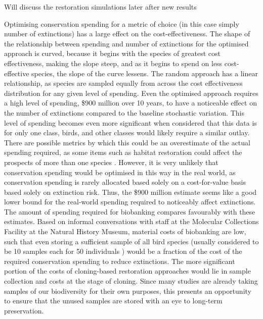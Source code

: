 \documentclass[10pt]{article}
\begin{document}
	Will discuss the restoration simulations later after new results
	
	Optimising conservation spending for a metric of choice
	(in this case simply number of extinctions)
	has a large effect on the cost-effectiveness. The shape
	of the relationship between spending and number of extinctions for the optimised
	approach is curved, because it begins with the species of greatest
	cost effectiveness, making the slope steep, and as it begins to spend on
	less cost-effective species, the slope of the curve lessens. The random approach
	has a linear relationship, as species are sampled equally
	from across the cost effectiveness distribution for any given level of spending.
	Even the optimised approach requires a high level of spending,
	\$900 million over 10 years, to have a noticeable
	effect on the number of extinctions compared to the baseline stochastic variation.
	This level of spending becomes even more significant when considered that
	this data is for only one class, birds, and other classes would likely require
	a similar outlay. There are possible metrics by which this
	could be an overestimate of the actual spending required, as some
	items such as habitat restoration could affect the prospects
	of more than one species
	\citep{mccarthyFinancialCostsMeeting2012}. However, it is very unlikely that
	conservation spending would be optimised in this way in the real world, as
	conservation spending is rarely allocated based solely on a cost-for-value basis
	based solely on extinction risk. Thus, the \$900 million estimate
	seems like a good lower bound for the real-world spending required
	to noticeably affect extinctions.
	The amount of spending required for biobanking compares
	favourably with these estimates. Based on informal conversations with staff at the
	Molecular Collections Facility at the Natural History Museum, material costs
	of biobanking are low, such that even storing a sufficient sample of all bird
	species (usually considered to be 10 samples each for 50 individuals
	\citep{harwoodDevelopingImplementingPrioritisation2021}) would be
	a fraction of the cost of the required conservation spending to reduce
	extinctions. The more significant portion of the costs of cloning-based
	restoration approaches would lie in sample collection and costs at the
	stage of cloning. Since many studies are already taking samples of our
	biodiversity for their own purposes, this presents an opportunity to ensure
	that the unused samples are stored with an eye to long-term
	preservation.
	
\end{document}
